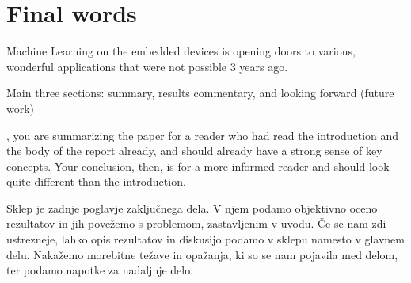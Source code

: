 \section{Final words}

Machine Learning on the embedded devices is opening doors to various, wonderful applications that were not possible 3 years ago.






Main three sections: summary, results commentary, and looking forward (future work)

, you are summarizing the paper for a reader who had read the introduction and the body of the report already, and should already have a strong sense of key concepts. Your conclusion, then, is for a more informed reader and should look quite different than the introduction.



Sklep je zadnje poglavje zaključnega dela. V njem podamo objektivno oceno rezultatov in
jih povežemo s problemom, zastavljenim v uvodu. Če se nam zdi ustrezneje, lahko opis
rezultatov in diskusijo podamo v sklepu namesto v glavnem delu. Nakažemo morebitne
težave in opažanja, ki so se nam pojavila med delom, ter podamo napotke za nadaljnje
delo.
